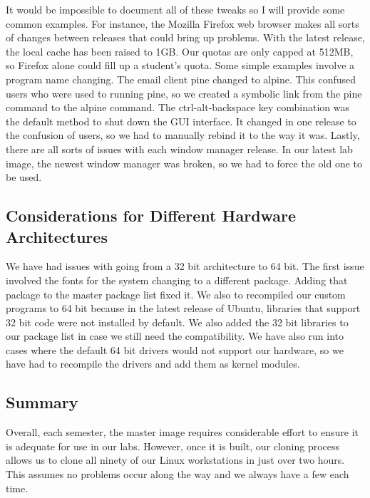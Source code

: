 It would be impossible to document all of these tweaks so I will provide some common examples.  For instance, the Mozilla Firefox web browser makes all sorts of changes between releases that could bring up problems.  With the latest release, the local cache has been raised to 1GB.  Our quotas are only capped at 512MB, so Firefox alone could fill up a student's quota.  Some simple examples involve a program name changing.  The email client pine changed to alpine.  This confused users who were used to running pine, so we created a symbolic link from the pine command to the alpine command.  The ctrl-alt-backspace key combination was the default method to shut down the GUI interface.  It changed in one release to the confusion of users, so we had to manually rebind it to the way it was.  Lastly, there are all sorts of issues with each window manager release.  In our latest lab image, the newest window manager was broken, so we had to force the old one to be used.  

\subsection{Considerations for Different Hardware Architectures} 
We have had issues with going from a 32 bit architecture to 64 bit.  The first issue involved the fonts for the system changing to a different package.  Adding that package to the master package list fixed it.  We also to recompiled our custom programs to 64 bit because in the latest release of Ubuntu, libraries that support 32 bit code were not installed by default.  We also added the 32 bit libraries to our package list in case we still need the compatibility.  We have also run into cases where the default 64 bit drivers would not support our hardware, so we have had to recompile the drivers and add them as kernel modules.  

\subsection{Summary}
Overall, each semester, the master image requires considerable effort to ensure it is adequate for use in our labs.  However, once it is built, our cloning process allows us to clone all ninety of our Linux workstations in just over two hours.  This assumes no problems occur along the way and we always have a few each time. 
